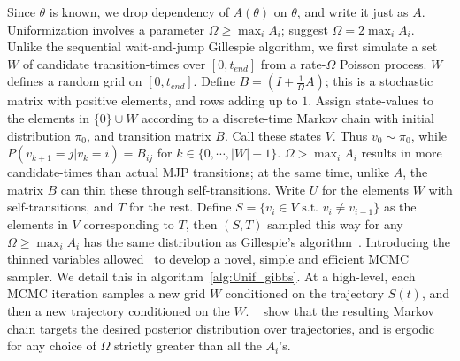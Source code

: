 Since $\theta$ is known, we drop dependency of $A(\theta)$ on $\theta$, and write it just as $A$. 
Uniformization involves a parameter $\Omega \ge \max_i A_i$; \cite{RaoTeh13} suggest $\Omega = 2 \max_i A_i$. 
Unlike the sequential wait-and-jump Gillespie algorithm, we first simulate a set $W$ of candidate transition-times over $[0,t_{end}]$ from a rate-$\Omega$ Poisson process. 
$W$ defines a random grid on $[0,t_{end}]$.
Define $B = \left(I +\frac{1}{\Omega}A\right)$; this is a
stochastic matrix with positive elements, and rows adding up to $1$.
Assign state-values to the elements in $\{0\} \cup W$ according to a discrete-time 
Markov chain with initial distribution $\pi_0$, and transition matrix $B$.
Call these states $V$. Thus $v_0 \sim \pi_0$, while $P(v_{k+1}=j|v_k=i) = B_{ij}$
for $k \in \{0,\cdots,|W|-1\}$.
$\Omega > \max_i A_i$ results in more
candidate-times than actual MJP transitions; at the same time, unlike $A$, 
the matrix $B$ can thin these through self-transitions. Write $U$ for 
the elements $W$ with self-transitions, and $T$ for the rest.
Define $S=\{v_i \in V \text{ s.t.\ } v_i \neq v_{i-1}\}$
as the elements in $V$ corresponding to $T$, then $(S,T)$
sampled this way for any $\Omega \ge \max_i A_i$
has the same distribution as Gillespie's algorithm~\citep{Jen1953,RaoTeh13}.
Introducing the thinned variables allowed~\cite{RaoTeh13} to develop
a novel, simple and efficient MCMC sampler. We detail this in algorithm~\ref{alg:Unif_gibbs}. At a 
high-level, each MCMC iteration 
samples a new grid $W$ conditioned on the trajectory $S(t)$, 
and then a new trajectory conditioned on the $W$. 
    ~\cite{RaoTeh13} show that the resulting Markov chain targets
    the desired posterior distribution over trajectories, and is 
    ergodic for any choice of $\Omega$ strictly greater than all the
    $A_i$'s. 
